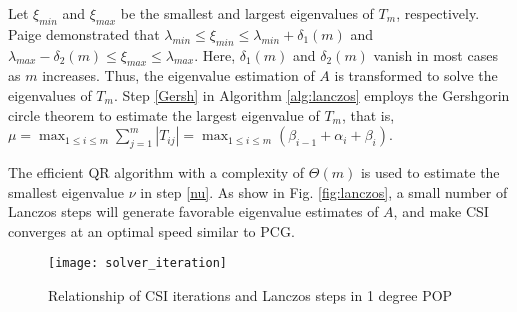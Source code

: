 \documentclass{sig-alternate}
\begin{document}
Let $\xi_{min}$ and $\xi_{max}$ be the smallest and largest eigenvalues of $T_m$, respectively. Paige\cite{Paige1980235} demonstrated that
$\lambda_{min} \le \xi_{min} \le \lambda_{min}+\delta_1(m)$ and $\lambda_{max}-\delta_2(m)  \le \xi_{max} \le \lambda_{max}$.
Here, $\delta_1(m)$ and $\delta_2(m)$ vanish in most cases as $m$ increases. Thus, the eigenvalue estimation of $A$ is transformed to solve the eigenvalues of $T_m$.
Step \ref{Gersh} in Algorithm  \ref{alg:lanczos} employs the Gershgorin circle theorem to estimate the largest eigenvalue of $T_m$, that is,
$\mu = \max_{1 \le i \le m}\sum^m_{j=1}|T_{ij}|=\max_{1 \le i \le m}(\beta_{i-1}+\alpha_i +\beta_{i})$.

The efficient QR algorithm \cite{ortega1963llt} with a complexity of $\Theta(m)$ is used to estimate the smallest eigenvalue $\nu$ in step \ref{nu}. As show in Fig. \ref{fig:lanczos}, a small number of Lanczos steps will generate favorable eigenvalue estimates of $A$, and make CSI converges at an optimal speed similar to PCG.

\begin {figure}
\centering
\texttt{[image: solver\_iteration]}
\caption []{Relationship of CSI iterations and Lanczos steps in 1 degree POP \label {fig:iter}}
\end {figure}


\end{document}
